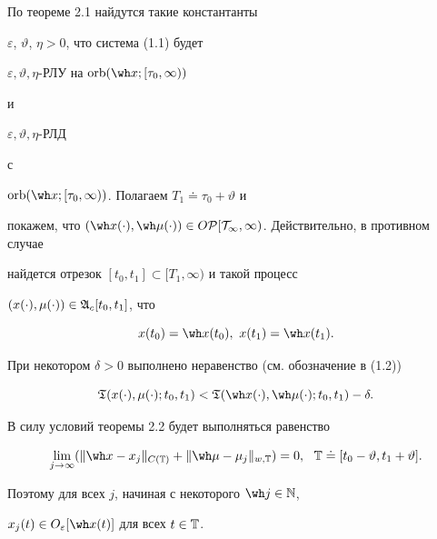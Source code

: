 \begin{pf}


По теореме 2.1 найдутся такие константанты


$\varepsilon$, $\vartheta$, $\eta>0$, что система (1.1) будет


$\varepsilon,\vartheta,\eta$-РЛУ на $\orb(\wh


x;[\tau_0,\infty))$


и


$\varepsilon,\vartheta,\eta$-РЛД


с


$\orb(\wh x;[\tau_0,\infty))$. Полагаем $T_1\doteq\tau_0+\vartheta$ и


покажем, что $(\wh x(\cdot),\wh\mu(\cdot))


\in O\cal P[T_1,\infty)$. Действительно, в противном случае


найдется отрезок $[t_0,t_1]\subset[T_1,\infty)$ и такой процесс


$(x(\cdot),\mu(\cdot))\in\frak A_c[t_0,t_1]$, что


\begin{equation}


x(t_0)=\wh x(t_0),\ x(t_1)=\wh x(t_1).


\end{equation} 


При некотором $\delta>0$ выполнено неравенство (см. обозначение в (1.2))


\begin{equation}


\frak T(x(\cdot),\mu(\cdot);t_0,t_1)<


\frak T(\wh x(\cdot),\wh\mu(\cdot);t_0,t_1)-\delta.


\end{equation}





В силу условий теоремы 2.2 будет выполняться равенство


\begin{equation}


\lim_{j\to\infty}(\|\wh x-x_{j}\|_{C(\Bbb T)}+


\|\wh\mu-\mu_j\|_{w,\Bbb T})=0,\ \ \Bbb T\doteq[t_0-\vartheta,t_1+\vartheta].


\end{equation}


Поэтому для всех $j$, начиная с некоторого $\wh j\in\Bbb N$,


$x_j(t)\in O_{\varepsilon}[\wh x(t)]$ для всех $t\in\Bbb T$.



\end{pf}
